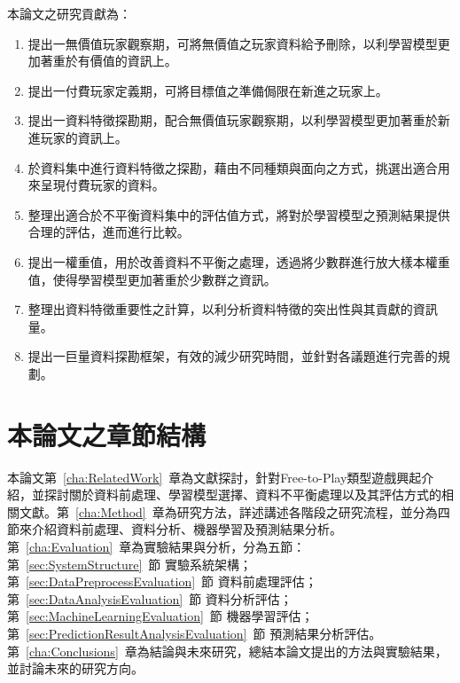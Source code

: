 本論文之研究貢獻為：

\begin{enumerate}
    \item 提出一無價值玩家觀察期，可將無價值之玩家資料給予刪除，以利學習模型更加著重於有價值的資訊上。
    \item 提出一付費玩家定義期，可將目標值之準備侷限在新進之玩家上。
    \item 提出一資料特徵探勘期，配合無價值玩家觀察期，以利學習模型更加著重於新進玩家的資訊上。
    \item 於資料集中進行資料特徵之探勘，藉由不同種類與面向之方式，挑選出適合用來呈現付費玩家的資料。
    \item 整理出適合於不平衡資料集中的評估值方式，將對於學習模型之預測結果提供合理的評估，進而進行比較。
    \item 提出一權重值，用於改善資料不平衡之處理，透過將少數群進行放大樣本權重值，使得學習模型更加著重於少數群之資訊。
    \item 整理出資料特徵重要性之計算，以利分析資料特徵的突出性與其貢獻的資訊量。
    \item 提出一巨量資料探勘框架，有效的減少研究時間，並針對各議題進行完善的規劃。
\end{enumerate}

\section{本論文之章節結構}

本論文第~\ref{cha:RelatedWork}~章為文獻探討，針對Free­-to-­Play類型遊戲興起介紹，並探討關於資料前處理、學習模型選擇、資料不平衡處理以及其評估方式的相關文獻。第~\ref{cha:Method}~章為研究方法，詳述講述各階段之研究流程，並分為四節來介紹資料前處理、資料分析、機器學習及預測結果分析。第~\ref{cha:Evaluation}~章為實驗結果與分析，分為五節：第~\ref{sec:SystemStructure}~節 實驗系統架構；第~\ref{sec:DataPreprocessEvaluation}~節 資料前處理評估；第~\ref{sec:DataAnalysisEvaluation}~節 資料分析評估；第~\ref{sec:MachineLearningEvaluation}~節 機器學習評估；第~\ref{sec:PredictionResultAnalysisEvaluation}~節 預測結果分析評估。第~\ref{cha:Conclusions}~章為結論與未來研究，總結本論文提出的方法與實驗結果，並討論未來的研究方向。
\newpage